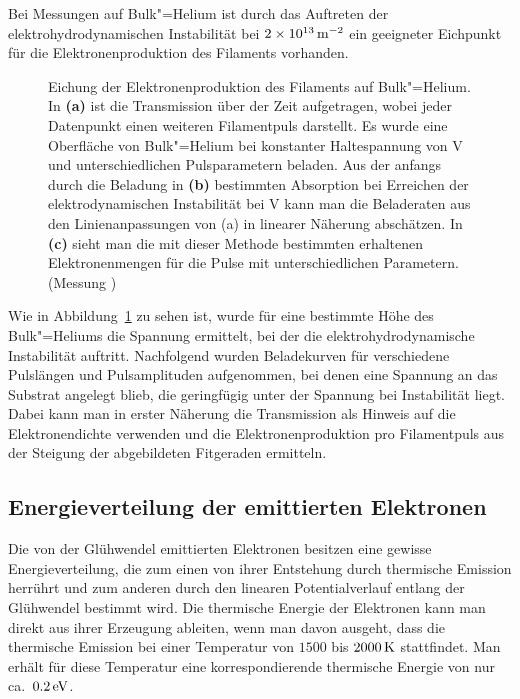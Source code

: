 Bei Messungen auf Bulk"=Helium ist durch das Auftreten der elektrohydrodynamischen Instabilität bei $\unit[2\times10^{13}]{\Em}$ ein geeigneter Eichpunkt für die Elektronenproduktion des Filaments vorhanden.
\begin{figure}[t!]
	\centerline{}
	\centerline{%
%
}
	\caption[Eichung der Elektronenproduktion]{Eichung der Elektronenproduktion des Filaments auf Bulk"=Helium. In {\bfseries (a)} ist die Transmission über der Zeit aufgetragen, wobei jeder Datenpunkt einen weiteren Filamentpuls darstellt. Es wurde eine Oberfläche von Bulk"=Helium bei konstanter Haltespannung von \unit[100]{V} und unterschiedlichen Pulsparametern beladen. Aus der anfangs durch die Beladung in {\bfseries (b)} bestimmten Absorption bei Erreichen der elektrodynamischen Instabilität bei \unit[384]{V} kann man die Beladeraten aus den Linienanpassungen von (a) in linearer Näherung abschätzen. In {\bfseries (c)} sieht man die mit dieser Methode bestimmten erhaltenen Elektronenmengen für die Pulse mit unterschiedlichen Parametern. (Messung )}
	\label{fig:fil_eichung}
\end{figure}

Wie in Abbildung~\ref{fig:fil_eichung} zu sehen ist, wurde für eine bestimmte Höhe des Bulk"=Heliums die Spannung ermittelt, bei der die elektrohydrodynamische Instabilität auftritt. Nachfolgend wurden Beladekurven für verschiedene Pulslängen und Pulsamplituden aufgenommen, bei denen eine Spannung an das Substrat angelegt blieb, die geringfügig unter der Spannung bei Instabilität liegt. Dabei kann man in erster Näherung die Transmission als Hinweis auf die Elektronendichte verwenden und die Elektronenproduktion pro Filamentpuls aus der Steigung der abgebildeten Fitgeraden ermitteln.

\subsection{Energieverteilung der emittierten Elektronen}

Die von der Glühwendel emittierten Elektronen besitzen eine gewisse Energieverteilung, die zum einen von ihrer Entstehung durch thermische Emission herrührt und zum anderen durch den linearen Potentialverlauf entlang der Glühwendel bestimmt wird. Die thermische Energie der Elektronen kann man direkt aus ihrer Erzeugung ableiten, wenn man davon ausgeht, dass die thermische Emission bei einer Temperatur von $1500$ bis $\unit[2000]{K}$ stattfindet. Man erhält für diese Temperatur eine korrespondierende thermische Energie von nur ca.\ $\unit[0.2]{eV}$.

